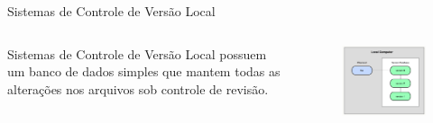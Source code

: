 \documentclass[12pt]{beamer}
\begin{document}
\begin{frame}{Sistemas de Controle de Versão Local}
	\begin{columns}
	    \begin{column}{0.5\textwidth}  %
	      \begin{center}
		 		Sistemas de Controle de Versão Local possuem um banco de dados simples que mantem todas as alterações nos arquivos sob controle de revisão.
			\end{center}
	    \end{column}\begin{column}{0.5\textwidth}
			\begin{figure}[!htb]
      		\centering
            \includegraphics[scale=0.4]{figuras/fig7.png} 
         \end{figure}
	    \end{column}
	    
	\end{columns}
\end{frame}
\end{document}
